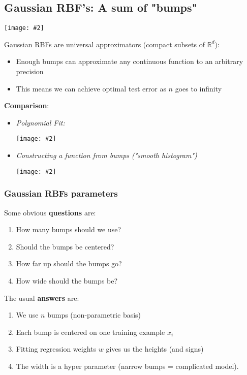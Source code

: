 \documentclass{article}
\def\blu#1{{\color{blu}#1}}
\def\gre#1{{\color{gre}#1}}
\newcommand{\centerfig}[2]{\begin{center}\texttt{[image: \#2]}\end{center}}
\begin{document}
\subsection*{Gaussian RBF's: A sum of "bumps"}
\centerfig{0.9}{gauss-1}
Gaussian RBFs are \blu{universal approximators} (compact subsets of $ \mathbb
{R}^d $):
\begin{itemize}
	\item Enough bumps can \gre{approximate any continuous function} to an arbitrary precision
	\item This means we can \gre{achieve optimal test error} as $ n $ goes to infinity
\end{itemize}
\textbf{Comparison}:
\begin{itemize}
	\item \textit{Polynomial Fit:}
	\centerfig{0.8}{poly-fit-1}
	\item \textit{Constructing a function from bumps ("smooth histogram")}
	\centerfig{0.8}{gauss-fit-1}
\end{itemize}

\subsubsection*{Gaussian RBFs parameters}
Some obvious \textbf{questions} are:
\begin{enumerate}
	\item How many bumps should we use?
	\item Should the bumps be centered?
	\item How far up should the bumps go?
	\item How wide should the bumps be?
\end{enumerate}
The usual \textbf{answers} are:
\begin{enumerate}
	\item We \gre{use $ n $ bumps} (non-parametric basis)
	\item Each bump is \gre{centered on one training example $ x_i $}
	\item Fitting regression weights \gre{$ w $ gives us the heights} (and signs)
	\item The \gre{width is a hyper parameter} (narrow bumps = complicated model).
\end{enumerate}
\end{document}
